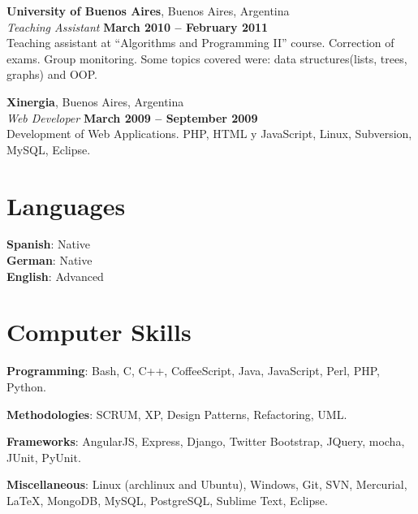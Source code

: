 \documentclass[margin,line]{resume}
\begin{document}
\begin{resume}
    \textbf{University of Buenos Aires}, Buenos Aires, Argentina \vspace{2mm}\\\vspace{1mm}%
    \textsl{Teaching Assistant} \hfill \textbf{March 2010 -- February 2011}\vspace{1.5mm}\\\vspace{0mm}%
    Teaching assistant at ``Algorithms and Programming II'' course. Correction of exams. Group monitoring. Some topics covered were: data structures(lists, trees, graphs) and OOP.

    \textbf{Xinergia}, Buenos Aires, Argentina \vspace{2mm}\\\vspace{1mm}%
    \textsl{Web Developer} \hfill \textbf{March 2009 -- September 2009}\\
	Development of Web Applications. PHP, HTML y JavaScript, Linux, Subversion, MySQL, Eclipse.
    \section{\mysidestyle Languages} 

	\textbf{Spanish}: Native \\
	\textbf{German}: Native   \\
	\textbf{English}: Advanced \\


    \section{\mysidestyle Computer Skills} 

	\textbf{Programming}: Bash, C, C++, CoffeeScript, Java, JavaScript, Perl, PHP, Python.

	\textbf{Methodologies}: SCRUM, XP, Design Patterns, Refactoring, UML.

	\textbf{Frameworks}: AngularJS, Express, Django, Twitter Bootstrap, JQuery, mocha,  JUnit, PyUnit.

	\textbf{Miscellaneous}: Linux (archlinux and Ubuntu), Windows, Git, SVN, Mercurial, \LaTeX , MongoDB, MySQL, PostgreSQL, Sublime Text, Eclipse.

\end{resume}
\end{document}
